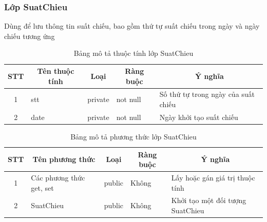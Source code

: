 \documentclass[a4paper, 12pt]{article}
\begin{document}
\subsubsection{Lớp SuatChieu}
Dùng để lưu thông tin suất chiếu, bao gồm thứ tự suất chiếu trong ngày và ngày chiếu tương ứng
\begin{table}[H]
	\begin{center}
		\begin{tabular}{|c|l|c|l|l|}
			\hline
			STT & \multicolumn{1}{c|}{Tên thuộc tính} & Loại                         & \multicolumn{1}{c|}{Ràng buộc} & \multicolumn{1}{c|}{Ý nghĩa}        \\ \hline
			1   & stt                                 & private                      & not null                       & Số thứ tự trong ngày của suất chiếu \\ \hline
			2   & date                                & \multicolumn{1}{l|}{private} & not null                       & Ngày khởi tạo suất chiếu            \\ \hline
		\end{tabular}
		\caption{Bảng mô tả thuộc tính lớp SuatChieu}
	\end{center}
\end{table}

\begin{table}[H]
	\begin{center}
		\begin{tabular}{|c|l|c|l|l|}
			\hline
			STT & \multicolumn{1}{c|}{Tên phương thức} & Loại                        & \multicolumn{1}{c|}{Ràng buộc} & \multicolumn{1}{c|}{Ý nghĩa}     \\ \hline
			1   & Các phương thức get, set             & public                      &                 Không               & Lấy hoặc gán giá trị thuộc tính  \\ \hline
			2   & SuatChieu                            & \multicolumn{1}{l|}{public} &                      Không          & Khởi tạo một đối tượng SuatChieu \\ \hline
			\end{tabular}
		\caption{Bảng mô tả phương thức lớp SuatChieu}
	\end{center}
\end{table}
\end{document}
